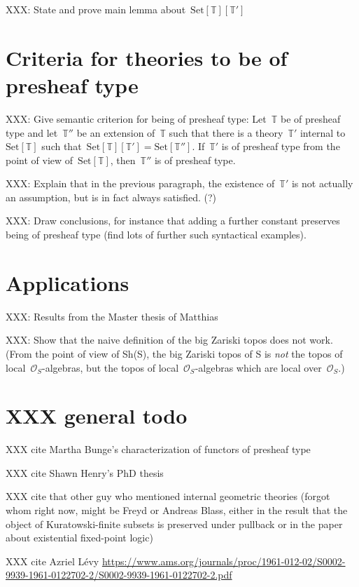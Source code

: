 \documentclass[oneside,reqno]{amsart}
\theoremstyle{definition}
\theoremstyle{plain}
\theoremstyle{remark}
\newcommand{\TT}{\mathbb{T}}
\renewcommand{\O}{\mathcal{O}}
\newcommand{\Set}{\mathrm{Set}}
\renewcommand{\_}{\mathpunct{.}\,}
\newcommand{\?}{\,{:}\,}
\begin{document}
XXX: State and prove main lemma about~$\Set[\TT][\TT']$


\section{Criteria for theories to be of presheaf type}

XXX: Give semantic criterion for being of presheaf type: Let~$\TT$ be of
presheaf type and let~$\TT''$ be an extension of~$\TT$ such that there is a
theory~$\TT'$ internal to~$\Set[\TT]$ such that~$\Set[\TT][\TT'] =
\Set[\TT'']$. If~$\TT'$ is of presheaf type from the point of view
of~$\Set[\TT]$, then~$\TT''$ is of presheaf type.

XXX: Explain that in the previous paragraph, the existence of~$\TT'$ is not
actually an assumption, but is in fact always satisfied. (?)

XXX: Draw conclusions, for instance that adding a further constant preserves
being of presheaf type (find lots of further such syntactical examples).


\section{Applications}

XXX: Results from the Master thesis of Matthias

XXX: Show that the naive definition of the big Zariski topos does not work.
(From the point of view of Sh(S), the big Zariski topos of S is \emph{not} the
topos of local~$\O_S$-algebras, but the topos of local~$\O_S$-algebras which
are local over~$\O_S$.)


\section{XXX general todo}

XXX cite Martha Bunge's characterization of functors of presheaf type

XXX cite Shawn Henry's PhD thesis

XXX cite that other guy who mentioned internal geometric theories (forgot whom
right now, might be Freyd or Andreas Blass, either in the result that the
object of Kuratowski-finite subsets is preserved under pullback or in the paper
about existential fixed-point logic)

XXX cite Azriel Lévy
\url{https://www.ams.org/journals/proc/1961-012-02/S0002-9939-1961-0122702-2/S0002-9939-1961-0122702-2.pdf}

\printbibliography
\end{document}
